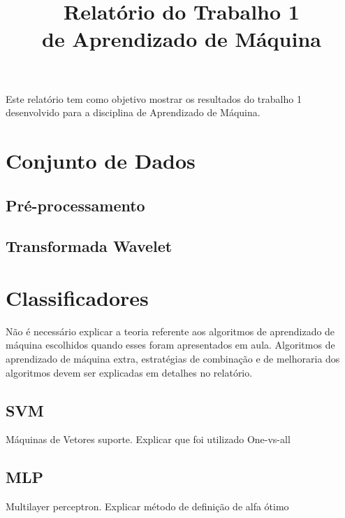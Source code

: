 \documentclass[conference]{IEEEtran}
\begin{document}
\title{Relatório do Trabalho 1\\ de Aprendizado de Máquina}

\author{
}

\maketitle


Este relatório tem como objetivo mostrar os resultados do trabalho 1 desenvolvido para a disciplina de Aprendizado de Máquina.


\section{Conjunto de Dados}

\subsection{Pré-processamento}

\subsection{Transformada Wavelet}

\section{Classificadores}
Não é necessário explicar a teoria referente aos algoritmos de aprendizado de máquina
escolhidos quando esses foram apresentados em aula. Algoritmos de aprendizado de máquina
extra, estratégias de combinação e de melhoraria dos algoritmos devem ser explicadas em
detalhes no relatório.

\subsection{SVM}
Máquinas de Vetores suporte.
Explicar que foi utilizado One-vs-all


\subsection{MLP}
Multilayer perceptron.
Explicar método de definição de alfa ótimo
\end{document}

